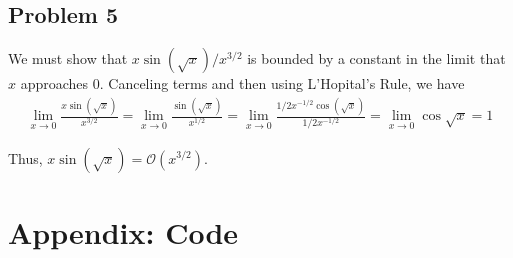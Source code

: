 \documentclass{homework}
\begin{document}
\begin{letterenum}
\section{Problem 5}
We must show that $x\sin(\sqrt{x}) / x^{3/2}$ is bounded by a constant in the limit
that $x$ approaches 0. Canceling terms and then using L'Hopital's Rule, we have
\begin{align*}
    \lim_{x\to 0} \frac{x \sin(\sqrt{x})}{x^{3/2}}
        = \lim_{x\to 0} \frac{ \sin(\sqrt{x})}{x^{1/2}}
        = \lim_{x\to 0} \frac{1/2 x^{-1/2} \cos(\sqrt{x})}{1/2 x^{-1/2}}
        = \lim_{x\to 0} \cos{\sqrt{x}} = 1
\end{align*}

Thus, $x \sin(\sqrt{x}) = \mathcal{O}(x^{3/2})$.







\end{letterenum}

\section{Appendix: Code}
\end{document}
